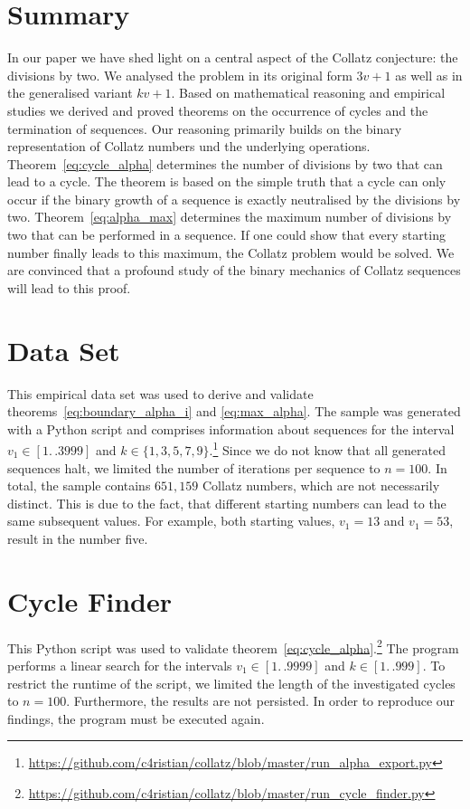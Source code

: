 \documentclass{SciPress_2015}
\renewcommand{\large}{\fontsize{14}{18pt}\selectfont}
\newcommand{\titleformat}{\sffamily\bfseries \large}						%
\begin{document}
\section{Summary}
In our paper we have shed light on a central aspect of the Collatz conjecture: the divisions by two. We analysed the problem in its original form $3v+1$ as well as in the generalised variant $kv+1$. Based on mathematical reasoning and empirical studies we derived and proved theorems on the occurrence of cycles and the termination of sequences. Our reasoning primarily builds on the binary representation of Collatz numbers und the underlying operations. Theorem~\ref{eq:cycle_alpha} determines the number of divisions by two that can lead to a cycle. The theorem is based on the simple truth that a cycle can only occur if the binary growth of a sequence is exactly neutralised by the divisions by two. Theorem~\ref{eq:alpha_max} determines the maximum number of divisions by two that can be performed in a sequence. If one could show that every starting number finally leads to this maximum, the Collatz problem would be solved. We are convinced that a profound study of the binary mechanics of Collatz sequences will lead to this proof.\\[1.5em]

\par\noindent
{\titleformat{Appendix}}
\section{Data Set}
\label{appx:data_set}
This empirical data set was used to derive and validate theorems~\ref{eq:boundary_alpha_i} and \ref{eq:max_alpha}. The sample was generated with a Python script and comprises information about sequences for the interval $v_1\in[1\mathrel{{.}\,{.}}3999]$ and $k\in\{1,3,5,7,9\}$.\footnote{\url{https://github.com/c4ristian/collatz/blob/master/run_alpha_export.py}} Since we do not know that all generated sequences halt, we limited the number of iterations per sequence to $n=100$. In total, the sample contains $651,159$ Collatz numbers, which are not necessarily distinct. This is due to the fact, that different starting numbers can lead to the same subsequent values. For example, both starting values, $v_1=13$ and $v_1=53$, result in the number five.

\section{Cycle Finder}
\label{appx:cycle_finder}
This Python script was used to validate theorem~\ref{eq:cycle_alpha}.\footnote{\url{https://github.com/c4ristian/collatz/blob/master/run_cycle_finder.py}} The program performs a linear search for the intervals $v_1\in[1\mathrel{{.}\,{.}}9999]$ and $k\in[1\mathrel{{.}\,{.}}999]$. To restrict the runtime of the script, we limited the length of the investigated cycles to $n=100$. Furthermore, the results are not persisted. In order to reproduce our findings, the program must be executed again.
\end{document}
